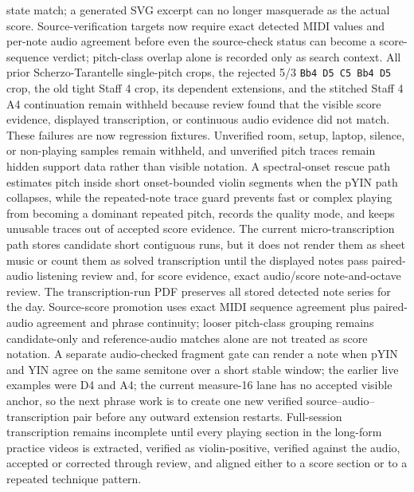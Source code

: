 \documentclass[12pt,letterpaper]{article}
\begin{document}
state match; a generated SVG excerpt can no longer masquerade as the actual score. Source-verification targets now require exact detected MIDI values and per-note audio agreement before even the source-check status can become a score-sequence verdict; pitch-class overlap alone is recorded only as search context. All prior Scherzo-Tarantelle single-pitch crops, the rejected 5/3 \texttt{Bb4 D5 C5 Bb4 D5} crop, the old tight Staff 4 crop, its dependent extensions, and the stitched Staff 4 A4 continuation remain withheld because review found that the visible score evidence, displayed transcription, or continuous audio evidence did not match. These failures are now regression fixtures. Unverified room, setup, laptop, silence, or non-playing samples remain withheld, and unverified pitch traces remain hidden support data rather than visible notation. A spectral-onset rescue path estimates pitch inside short onset-bounded violin segments when the pYIN path collapses, while the repeated-note trace guard prevents fast or complex playing from becoming a dominant repeated pitch, records the quality mode, and keeps unusable traces out of accepted score evidence. The current micro-transcription path stores candidate short contiguous runs, but it does not render them as sheet music or count them as solved transcription until the displayed notes pass paired-audio listening review and, for score evidence, exact audio/score note-and-octave review. The transcription-run PDF preserves all stored detected note series for the day. Source-score promotion uses exact MIDI sequence agreement plus paired-audio agreement and phrase continuity; looser pitch-class grouping remains candidate-only and reference-audio matches alone are not treated as score notation. A separate audio-checked fragment gate can render a note when pYIN and YIN agree on the same semitone over a short stable window; the earlier live examples were D4 and A4; the current measure-16 lane has no accepted visible anchor, so the next phrase work is to create one new verified source--audio--transcription pair before any outward extension restarts. Full-session transcription remains incomplete until every playing section in the long-form practice videos is extracted, verified as violin-positive, verified against the audio, accepted or corrected through review, and aligned either to a score section or to a repeated technique pattern.
\end{document}
